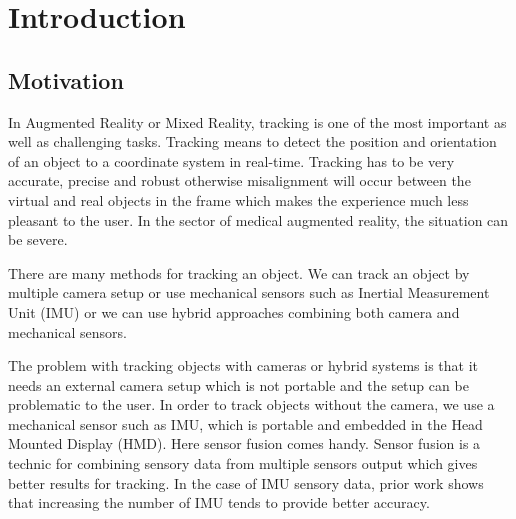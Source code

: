 
\chapter{Introduction}\label{chapter:introduction}

\section{Motivation}
In Augmented Reality or Mixed Reality, tracking is one of the most important as well as challenging tasks. Tracking means to detect the position and orientation of an object to a coordinate system in real-time. Tracking has to be very accurate, precise and robust otherwise misalignment will occur between the virtual and real objects in the frame which makes the experience much less pleasant to the user. In the sector of medical augmented reality, the situation can be severe.

There are many methods for tracking an object. We can track an object by multiple camera setup or use mechanical sensors such as Inertial Measurement Unit (IMU) or we can use hybrid approaches combining both camera and mechanical sensors.

The problem with tracking objects with cameras or hybrid systems is that it needs an external camera setup which is not portable and the setup can be problematic to the user. In order to track objects without the camera, we use a mechanical sensor such as IMU, which is portable and embedded in the Head Mounted Display (HMD). Here sensor fusion comes handy. Sensor fusion is a technic for combining sensory data from multiple sensors output which gives better results for tracking. In the case of IMU sensory data, prior work \cite{8951908}  shows that increasing the number of IMU tends to provide better accuracy.

